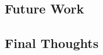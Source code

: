 

\subsection{Future Work}
\label{sec:future-work}


\subsection{Final Thoughts}
\label{sec:final-thoughts}


